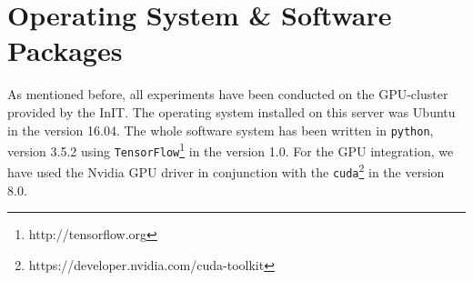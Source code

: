 \section{Operating System \& Software Packages}
As mentioned before, all experiments have been conducted on the GPU-cluster provided by the InIT. The operating system installed on this server was Ubuntu in the version 16.04. The whole software system has been written in \texttt{python}, version 3.5.2 using \texttt{TensorFlow}\footnote{http://tensorflow.org} in the version 1.0. For the GPU integration, we have used the Nvidia GPU driver in conjunction with the \texttt{cuda}\footnote{https://developer.nvidia.com/cuda-toolkit} in the version 8.0.
